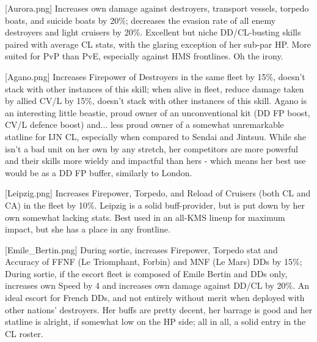 [Aurora.png]
{Increases own damage against destroyers, transport vessels, torpedo boats, and suicide boats by 20\%; decreases the evasion rate of all enemy destroyers and light cruisers by 20\%.}
{}
{Excellent but niche DD/CL-busting skills paired with average CL stats, with the glaring exception of her sub-par HP. More suited for PvP than PvE, especially against HMS frontlines. Oh the irony.}

[Agano.png]
{Increases Firepower of Destroyers in the same fleet by 15\%, doesn't stack with other instances of this skill; when alive in fleet, reduce damage taken by allied CV/L by 15\%, doesn't stack with other instances of this skill.}
{}
{Agano is an interesting little beastie, proud owner of an unconventional kit (DD FP boost, CV/L defence boost) and... less proud owner of a somewhat unremarkable statline for IJN CL, especially when compared to Sendai and Jintsuu. While she isn't a bad unit on her own by any stretch, her competitors are more powerful and their skills more wieldy and impactful than hers - which means her best use would be as a DD FP buffer, similarly to London.}

[Leipzig.png]
{Increases Firepower, Torpedo, and Reload of Cruisers (both CL and CA) in the fleet by 10\%.}
{}
{Leipzig is a solid buff-provider, but is put down by her own somewhat lacking stats. Best used in an all-KMS lineup for maximum impact, but she has a place in any frontline.}

[Emile_Bertin.png]
{During sortie, increases Firepower, Torpedo stat and Accuracy of FFNF (Le Triomphant, Forbin) and MNF (Le Mars) DDs by 15\%; During sortie, if the escort fleet is composed of Emile Bertin and DDs only, increases own Speed by 4 and increases own damage against DD/CL by 20\%. }
{}
{An ideal escort for French DDs, and not entirely without merit when deployed with other nations' destroyers. Her buffs are pretty decent, her barrage is good and her statline is alright, if somewhat low on the HP side; all in all, a solid entry in the CL roster.}
 
 
\newpage
